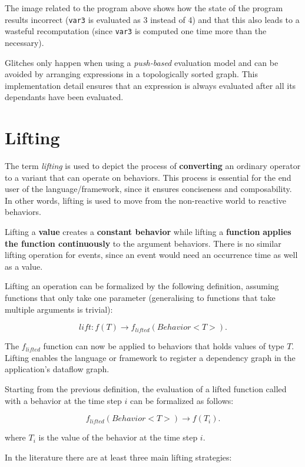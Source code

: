 The image related to the program above shows how the state of the
program results incorrect (\texttt{var3} is evaluated as 3 instead of 4)
and that this also leads to a wasteful recomputation (since
\texttt{var3} is computed one time more than the necessary).

Glitches only happen when using a \emph{push-based} evaluation model
and can be avoided by arranging expressions in a topologically sorted
graph. This implementation detail ensures that an expression is always
evaluated after all its dependants have been evaluated.

\section{Lifting}\label{lifting}

The term \emph{lifting} is used to depict the process of
\textbf{converting} an ordinary operator to a variant that can operate
on behaviors. This process is essential for the end user of the
language/framework, since it ensures conciseness and composability. In
other words, lifting is used to move from the non-reactive world to
reactive behaviors.

Lifting a \textbf{value} creates a \textbf{constant behavior} while
lifting a \textbf{function} \textbf{applies the function continuously}
to the argument behaviors. There is no similar lifting operation for
events, since an event would need an occurrence time as well as a value.

Lifting an operation can be formalized by the following definition,
assuming functions that only take one parameter (generalising to
functions that take multiple arguments is trivial):

\[
lift: f(T)  \rightarrow f_{lifted} (Behavior < T >).
\]

The \(f_{lifted}\) function can now be applied to behaviors that holds
values of type \(T\). Lifting enables the language or framework to
register a dependency graph in the application's dataflow graph.

Starting from the previous definition, the evaluation of a lifted
function called with a behavior at the time step \(i\) can be formalized
as follows:

\[
f_{lifted}(Behavior < T >)  \rightarrow f(T_i) .
\]

where \(T_i\) is the value of the behavior at the time step \(i\).


In the literature there are at least three main lifting strategies:

